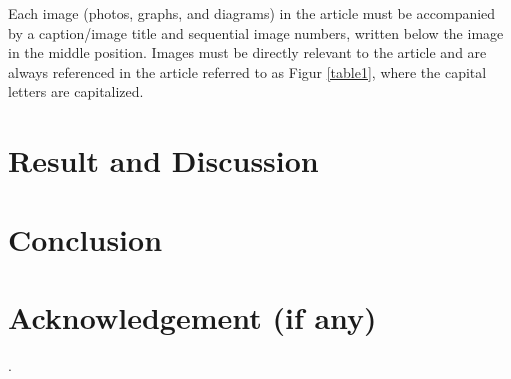 \documentclass[twocolumn]{article}
\begin{document}
Each image (photos, graphs, and diagrams) in the article must be accompanied by a caption/image title and sequential image numbers, written below the image in the middle position. Images must be directly relevant to the article and are always referenced in the article referred to as Figur \ref{table1}, where the capital letters are capitalized.






\section{Result and Discussion}



\section{Conclusion}

\section{Acknowledgement (if any)}

\clearpage

\nocite{*}

.
\end{document}
